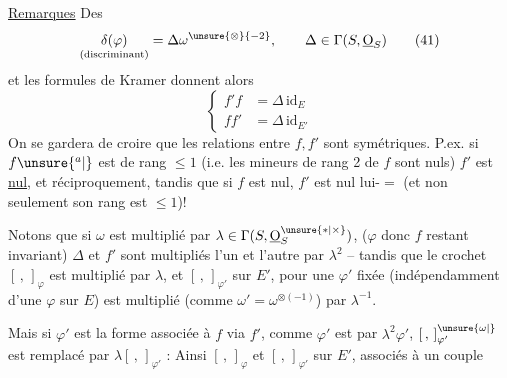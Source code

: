 \uline{Remarques} Des 
\[
 \underset{\text{(discriminant)}}{\delta(\varphi)}=\Delta\omega^{\unsure{\otimes}{-2}},\qquad\Delta\in\Gamma(S,\underline{\mathrm O}_S) \tag*{(41)}
\]
et les formules de Kramer donnent alors
\[
 \left\{\begin{aligned}
 f'f&=\Delta\,\mathrm{id}_E\\
 ff'&=\Delta\,\mathrm{id}_{E'}
 \end{aligned}\right. \tag*{(42)}
\]
On se gardera de croire que les relations entre $f,f'$ sont symétriques. P.ex. si $f\unsure{^{a}|}$ est de rang $\leq1$ (i.e. les mineurs de rang 2 de $f$ sont nuls) $f'$ est \uline{nul}, et réciproquement, tandis que si $f$ est nul, $f'$ est nul lui-$=$ (et non seulement son rang est $\leq1$)!

Notons que si $\omega$ est multiplié par $\lambda\in\Gamma(S,\underline{\mathrm O}_S^{\unsure{*|\times}})$, ($\varphi$ donc $f$ restant invariant) $\Delta$ et $f'$ sont multipliés l'un et l'autre par $\lambda^2$ -- tandis que le crochet $[\, ,\,]_\varphi$  est multiplié par $\lambda$, et  $[\, ,\,]_{\varphi'}$ sur $E'$, pour  une $\varphi'$ fixée (indépendamment d'une $\varphi$ sur $E$) est multiplié (comme $\omega'=\omega^{\otimes(-1)}$) par $\lambda^{-1}$.

Mais si $\varphi'$ est la forme associée à $f$ via $f'$, comme  $\varphi'$ est  par $\lambda^2\varphi'$, $[\, ,\,]_{\varphi'}^{\unsure{\omega|}}$ est remplacé par $\lambda[\, ,\,]_{\varphi'}$ : Ainsi $[\, ,\,]_\varphi$  et $[\, ,\,]_{\varphi'}$ sur $E'$, associés à un couple

